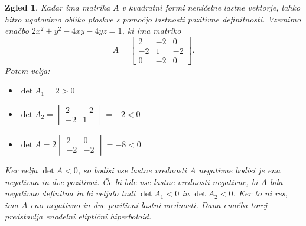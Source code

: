 \documentclass[10pt, a4paper]{article}
\newtheorem{zgled}{Zgled}[section]
\begin{document}
\begin{zgled}
    Kadar ima matrika $A$ v kvadratni formi neničelne lastne vektorje, lahko hitro ugotovimo obliko ploskve s pomočjo lastnosti pozitivne definitnosti.
    Vzemimo enačbo $2x^2 + y^2 - 4xy - 4yz = 1$, ki ima matriko 
    $$A = \begin{bmatrix}
        2 & -2 & 0\\
        -2 & 1 & -2\\
        0 & -2 & 0
    \end{bmatrix}.$$
    Potem velja:
    \begin{itemize}
        \item $ \det A_1 = 2 > 0$
        \item $\displaystyle \det A_2 = \begin{vmatrix}
            2 & -2\\
            -2 & 1
        \end{vmatrix} = -2 < 0$
        \item $\displaystyle \det A = 2 \begin{vmatrix}
            2 & 0\\
            -2 & -2
        \end{vmatrix} = - 8 < 0$
    \end{itemize}
    Ker velja $\det A < 0$, so bodisi vse lastne vrednosti $A$ negativne bodisi je ena negativna in dve pozitivni.
    Če bi bile vse lastne vrednosti negativne, bi $A$ bila negativno definitna in bi veljalo tudi $\det A_1 < 0$ in $\det A_2 < 0$.
    Ker to ni res, ima $A$ eno negativno in dve pozitivni lastni vrednosti.
    Dana enačba torej predstavlja enodelni eliptični hiperboloid.
\end{zgled}
\end{document}
